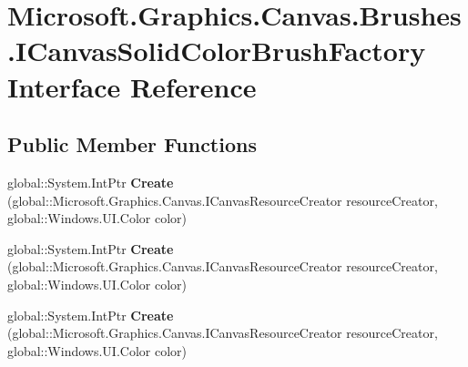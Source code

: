 \hypertarget{interface_microsoft_1_1_graphics_1_1_canvas_1_1_brushes_1_1_i_canvas_solid_color_brush_factory}{}\section{Microsoft.\+Graphics.\+Canvas.\+Brushes.\+I\+Canvas\+Solid\+Color\+Brush\+Factory Interface Reference}
\label{interface_microsoft_1_1_graphics_1_1_canvas_1_1_brushes_1_1_i_canvas_solid_color_brush_factory}
\subsection*{Public Member Functions}
\begin{DoxyCompactItemize}
\item 
\mbox{\label{interface_microsoft_1_1_graphics_1_1_canvas_1_1_brushes_1_1_i_canvas_solid_color_brush_factory_a6b5d12f659a021a3ef3b39738a0c5d28}} 
global\+::\+System.\+Int\+Ptr {\bfseries Create} (global\+::\+Microsoft.\+Graphics.\+Canvas.\+I\+Canvas\+Resource\+Creator resource\+Creator, global\+::\+Windows.\+U\+I.\+Color color)
\item 
\mbox{\label{interface_microsoft_1_1_graphics_1_1_canvas_1_1_brushes_1_1_i_canvas_solid_color_brush_factory_a6b5d12f659a021a3ef3b39738a0c5d28}} 
global\+::\+System.\+Int\+Ptr {\bfseries Create} (global\+::\+Microsoft.\+Graphics.\+Canvas.\+I\+Canvas\+Resource\+Creator resource\+Creator, global\+::\+Windows.\+U\+I.\+Color color)
\item 
\mbox{\label{interface_microsoft_1_1_graphics_1_1_canvas_1_1_brushes_1_1_i_canvas_solid_color_brush_factory_a6b5d12f659a021a3ef3b39738a0c5d28}} 
global\+::\+System.\+Int\+Ptr {\bfseries Create} (global\+::\+Microsoft.\+Graphics.\+Canvas.\+I\+Canvas\+Resource\+Creator resource\+Creator, global\+::\+Windows.\+U\+I.\+Color color)
\item 
\mbox{\label{interface_microsoft_1_1_graphics_1_1_canvas_1_1_brushes_1_1_i_canvas_solid_color_brush_factory_a6b5d12f659a021a3ef3b39738a0c5d28}} 

\end{DoxyCompactItemize}

